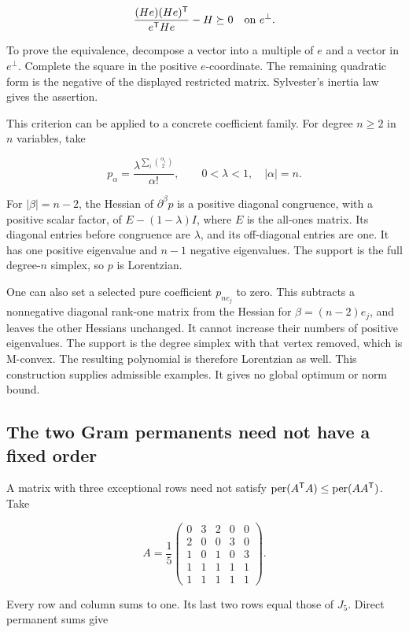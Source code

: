 \[
\frac{(He)(He)^{\mathsf{T}}}{e^{\mathsf{T}}He}-H\succeq0
\quad\text{on }e^\perp.
\]

To prove the equivalence, decompose a vector into a multiple of \(e\) and a vector in \(e^\perp\). Complete the square in the positive \(e\)-coordinate. The remaining quadratic form is the negative of the displayed restricted matrix. Sylvester's inertia law gives the assertion.

This criterion can be applied to a concrete coefficient family. For degree \(n\ge2\) in \(n\) variables, take

\[
p_\alpha=\frac{\lambda^{\sum_i\binom{\alpha_i}{2}}}{\alpha!},
\qquad0<\lambda<1,\quad|\alpha|=n.
\]

For \(|\beta|=n-2\), the Hessian of \(\partial^\beta p\) is a positive diagonal congruence, with a positive scalar factor, of \(E-(1-\lambda)I\), where \(E\) is the all-ones matrix. Its diagonal entries before congruence are \(\lambda\), and its off-diagonal entries are one. It has one positive eigenvalue and \(n-1\) negative eigenvalues. The support is the full degree-\(n\) simplex, so \(p\) is Lorentzian.

One can also set a selected pure coefficient \(p_{ne_j}\) to zero. This subtracts a nonnegative diagonal rank-one matrix from the Hessian for \(\beta=(n-2)e_j\), and leaves the other Hessians unchanged. It cannot increase their numbers of positive eigenvalues. The support is the degree simplex with that vertex removed, which is M-convex. The resulting polynomial is therefore Lorentzian as well. This construction supplies admissible examples. It gives no global optimum or norm bound.

\subsection{The two Gram permanents need not have a fixed order}\label{app:additional-27}

A matrix with three exceptional rows need not satisfy \(\operatorname{per}(A^{\mathsf{T}}A)\le\operatorname{per}(AA^{\mathsf{T}})\). Take

\[
A=\frac15\begin{pmatrix}
0&3&2&0&0\\
2&0&0&3&0\\
1&0&1&0&3\\
1&1&1&1&1\\
1&1&1&1&1
\end{pmatrix}.
\]

Every row and column sums to one. Its last two rows equal those of \(J_5\). Direct permanent sums give

